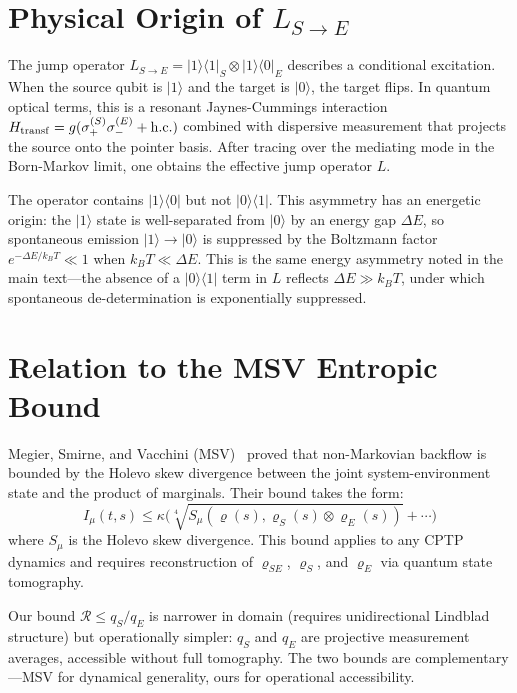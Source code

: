 \documentclass[aps,pra,onecolumn]{revtex4-2}
\begin{document}
\section{Physical Origin of $L_{S\to E}$}

The jump operator $L_{S\to E}=|1\rangle\langle 1|_S\otimes|1\rangle\langle 0|_E$ describes a conditional excitation. When the source qubit is $|1\rangle$ and the target is $|0\rangle$, the target flips. In quantum optical terms, this is a resonant Jaynes-Cummings interaction $H_{\rm transf} = g(\sigma_+^{(S)}\sigma_-^{(E)} + {\rm h.c.})$ combined with dispersive measurement that projects the source onto the pointer basis. After tracing over the mediating mode in the Born-Markov limit, one obtains the effective jump operator $L$.

The operator contains $|1\rangle\langle 0|$ but not $|0\rangle\langle 1|$. This asymmetry has an energetic origin: the $|1\rangle$ state is well-separated from $|0\rangle$ by an energy gap $\Delta E$, so spontaneous emission $|1\rangle \to |0\rangle$ is suppressed by the Boltzmann factor $e^{-\Delta E/k_B T} \ll 1$ when $k_B T \ll \Delta E$. This is the same energy asymmetry noted in the main text---the absence of a $|0\rangle\langle 1|$ term in $L$ reflects $\Delta E \gg k_B T$, under which spontaneous de-determination is exponentially suppressed.

\section{Relation to the MSV Entropic Bound}

Megier, Smirne, and Vacchini (MSV)~\cite{Megier:2021} proved that non-Markovian backflow is bounded by the Holevo skew divergence between the joint system-environment state and the product of marginals. Their bound takes the form:
\begin{equation}
I_\mu(t,s) \leq \kappa\Big(\sqrt[4]{S_\mu(\varrho(s), \varrho_S(s) \otimes \varrho_E(s))} + \cdots\Big)
\end{equation}
where $S_\mu$ is the Holevo skew divergence. This bound applies to any CPTP dynamics and requires reconstruction of $\varrho_{SE}$, $\varrho_S$, and $\varrho_E$ via quantum state tomography.

Our bound $\mathcal{R} \leq q_S/q_E$ is narrower in domain (requires unidirectional Lindblad structure) but operationally simpler: $q_S$ and $q_E$ are projective measurement averages, accessible without full tomography. The two bounds are complementary---MSV for dynamical generality, ours for operational accessibility.
\end{document}

